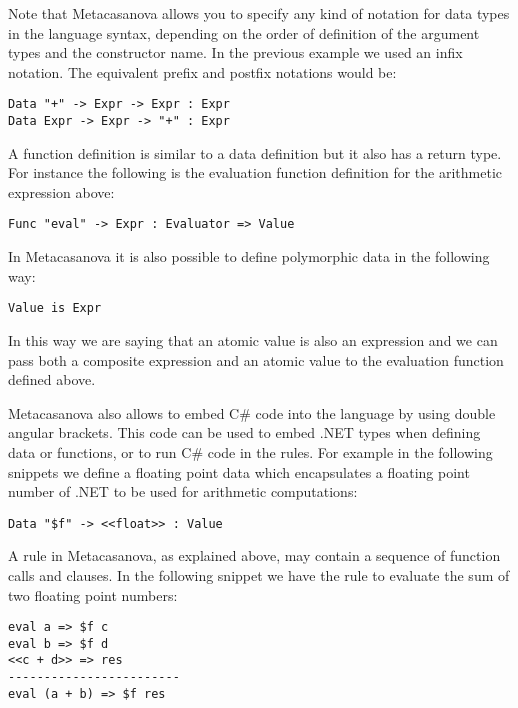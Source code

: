 \noindent
Note that Metacasanova allows you to specify any kind of notation for data types in the language syntax, depending on the order of definition of the argument types and the constructor name. In the previous example we used an infix notation. The equivalent prefix and postfix notations would be:

\begin{lstlisting}
Data "+" -> Expr -> Expr : Expr
Data Expr -> Expr -> "+" : Expr
\end{lstlisting}

\noindent
A function definition is similar to a data definition but it also has a return type. For instance the following is the evaluation function definition for the arithmetic expression above:

\begin{lstlisting}
Func "eval" -> Expr : Evaluator => Value
\end{lstlisting}

\noindent
In Metacasanova it is also possible to define polymorphic data in the following way:

\begin{lstlisting}
Value is Expr
\end{lstlisting}

\noindent
In this way we are saying that an atomic value is also an expression and we can pass both a composite expression and an atomic value to the evaluation function defined above.

Metacasanova also allows to embed C\# code into the language by using double angular brackets. This code can be used to embed .NET types when defining data or functions, or to run C\# code in the rules. For example in the following snippets we define a floating point data which encapsulates a floating point number of .NET to be used for arithmetic computations:

\begin{lstlisting}
Data "$f" -> <<float>> : Value
\end{lstlisting}

\noindent
A rule in Metacasanova, as explained above, may contain a sequence of function calls and clauses. In the following snippet we have the rule to evaluate the sum of two floating point numbers:

\begin{lstlisting}
eval a => $f c
eval b => $f d
<<c + d>> => res
------------------------
eval (a + b) => $f res
\end{lstlisting}

